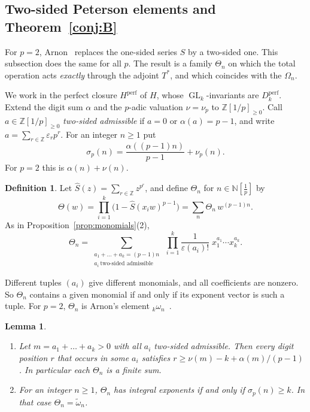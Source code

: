 \documentclass[11pt]{amsart}
\newtheorem{lemma}[theorem]{Lemma}
\theoremstyle{definition}
\newtheorem{definition}[theorem]{Definition}
\theoremstyle{remark}
\newcommand{\Dperf}{D_k^{\mathrm{perf}}}
\newcommand{\wt}{\widetilde{\omega}}
\DeclareMathOperator{\GL}{GL}
\begin{document}
\subsection{Two-sided Peterson elements and Theorem~\ref{conj:B}}\label{sec:arnon}
For $p=2$, Arnon~\cite{Arnon} replaces the one-sided series $S$ by a
two-sided one.  This subsection does the same for all $p$.  The result is a
family $\Theta_n$ on which the total operation acts \emph{exactly} through the
adjoint $T^*$, and which coincides with the $\Omega_n$.

We work in the perfect closure $H^{\mathrm{perf}}$ of $H$, whose
$\GL_k$-invariants are $\Dperf$.  Extend the digit sum $\alpha$ and the
$p$-adic valuation $\nu=\nu_p$ to $\mathbb{Z}[1/p]_{\ge0}$.  Call
$a\in\mathbb{Z}[1/p]_{\ge0}$ \emph{two-sided admissible} if $a=0$ or
$\alpha(a)=p-1$, and write $a=\sum_{r\in\mathbb{Z}}\varepsilon_rp^r$.  For an
integer $n\ge1$ put
\[
  \sigma_p(n)=\frac{\alpha((p-1)n)}{p-1}+\nu_p(n).
\]
For $p=2$ this is $\alpha(n)+\nu(n)$.

\begin{definition}
Let $\widehat S(z)=\sum_{r\in\mathbb{Z}}z^{p^r}$, and define $\Theta_n$ for
$n\in\mathbb{N}[\frac1p]$ by
\[
  \Theta(w)=\prod_{i=1}^k\bigl(1-\widehat S(x_iw)^{p-1}\bigr)
  =\sum_{n}\Theta_n\,w^{(p-1)n}.
\]
As in Proposition~\ref{prop:monomials}(2),
\[
  \Theta_n=\sum_{\substack{a_1+\dots+a_k=(p-1)n\\ a_i\ \text{two-sided admissible}}}
  \ \prod_{i=1}^k\frac{1}{\varepsilon(a_i)!}\;x_1^{a_1}\cdots x_k^{a_k}.
\]
\end{definition}

Different tuples $(a_i)$ give different monomials, and all coefficients are
nonzero.  So $\Theta_n$ contains a given monomial if and only if its exponent
vector is such a tuple.  For $p=2$, $\Theta_n$ is Arnon's element
${}_k\omega_n$~\cite[Def.~3.2]{Arnon}.

\begin{lemma}\label{lem:twosupport}
\begin{enumerate}
\item Let $m=a_1+\dots+a_k>0$ with all $a_i$ two-sided admissible.  Then every
  digit position $r$ that occurs in some $a_i$ satisfies
  $r\ge\nu(m)-k+\alpha(m)/(p-1)$.  In particular each $\Theta_n$ is a finite
  sum.
\item For an integer $n\ge1$, $\Theta_n$ has integral exponents if and only if
  $\sigma_p(n)\ge k$.  In that case $\Theta_n=\wt_n$.
\end{enumerate}
\end{lemma}
\end{document}
